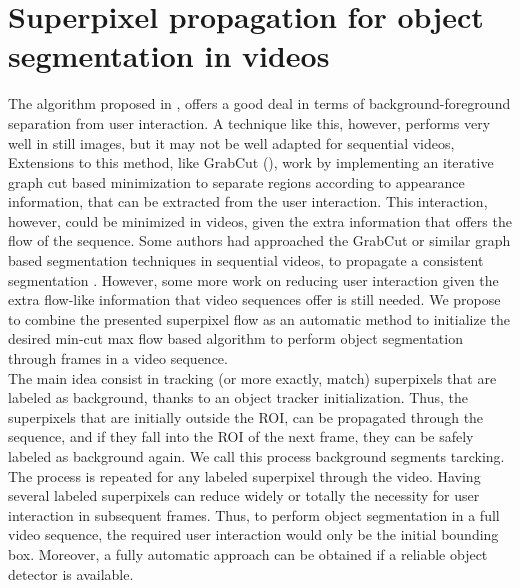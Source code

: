 \section{Superpixel propagation for object segmentation in videos}
\label{sec:segm}
The algorithm proposed in \cite{c18}, offers a good deal in terms of
background-foreground separation from user interaction. A technique like this, however,
performs very well in still images, but it may not be well adapted for sequential videos, 
Extensions to this method, like GrabCut (\cite{c14}), work by implementing an iterative graph cut based 
minimization to separate regions according to appearance information, that can be
extracted from the user interaction. This interaction, however, could be minimized in videos,
given the extra information that offers the flow of the sequence.
Some authors had approached the GrabCut or similar graph based segmentation techniques in sequential
videos, to propagate a consistent segmentation \cite{c15}.
However, some more work on reducing user interaction given the extra flow-like information
that video sequences offer is still needed.
We propose to combine the presented superpixel flow as an automatic method to initialize the
desired min-cut max flow based algorithm to perform object
segmentation through frames in a video sequence. \\

The main idea consist in tracking (or more exactly, match) superpixels that are labeled as background, 
thanks to an object tracker initialization. Thus, the superpixels that are initially outside the ROI, 
can be propagated through the sequence, and if they fall into the ROI of the next frame, they
can be safely labeled as background again. We call this process background segments tarcking. 
The process is repeated for any labeled superpixel through the video. Having several labeled superpixels can 
reduce widely or totally the necessity for user interaction in subsequent frames. Thus, to perform object segmentation in a full video sequence, the required
user interaction would only be the initial bounding box. Moreover, a fully automatic approach can be
obtained if a reliable object detector is available.

